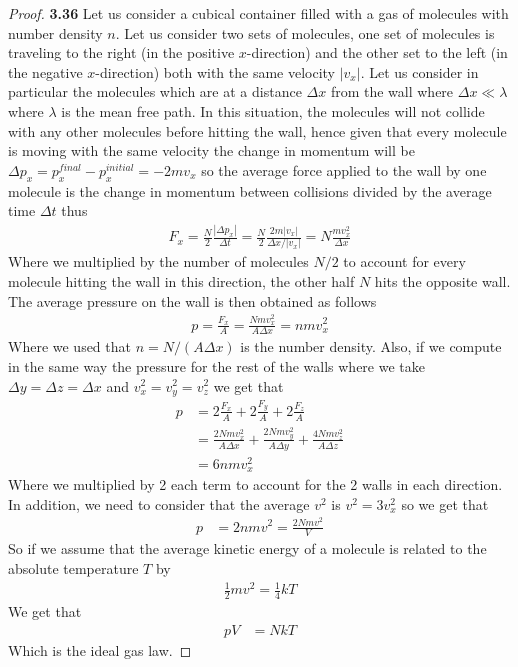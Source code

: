 \documentclass[11pt]{article}
\theoremstyle{definition}
\begin{document}
\begin{proof}{\textbf{3.36}}
    Let us consider a cubical container filled with  a gas of molecules with
    number density $n$.
    Let us consider two sets of molecules, one set of molecules
    is traveling to the right (in the positive $x$-direction)
    and the other set to the left (in the negative $x$-direction)
    both with the same velocity $|v_x|$.
    Let us consider in particular the molecules which are at a distance
    $\Delta x$ from the wall where $\Delta x \ll \lambda$ where $\lambda$
    is the mean free path. In this situation, the molecules will not collide
    with any other molecules before hitting the wall, hence given that
    every molecule is moving with the same velocity the change
    in momentum will be
    $\Delta p_{x} = p_x^{final} - p_x^{initial} = -2mv_{x}$ so the average
    force applied to the wall by one molecule is the change in momentum between
    collisions divided by the average time $\Delta t$ thus
    \begin{align*}
        F_{x} = \frac{N}{2}\frac{|\Delta p_{x}|}{\Delta t}
        = \frac{N}{2}\frac{2m|v_{x}|}{\Delta x/|v_{x}|}
        = N\frac{mv_{x}^2}{\Delta x}
    \end{align*}
    Where we multiplied by the number of molecules $N/2$ to account for every
    molecule hitting the wall in this direction, the other half $N$ hits
    the opposite wall.
    The average pressure on the wall is then obtained as follows
    \begin{align*}
        p = \frac{F_x}{A}
        = \frac{Nm v_x^2}{A\Delta x}
        = nm v_x^2
    \end{align*}
    Where we used that $n = N/(A\Delta x)$ is the number density.
    Also, if we compute in the same way the pressure for the rest of the walls
    where we take $\Delta y = \Delta z = \Delta x$ and $v_x^2 = v_y^2 = v_z^2$
    we get that
    \begin{align*}
        p &= 2\frac{F_x}{A} + 2\frac{F_y}{A} + 2\frac{F_z}{A}\\
        &= \frac{2Nm v_x^2}{A \Delta x} + \frac{2Nm v_y^2}{A \Delta y}
        + \frac{4Nm v_z^2}{A \Delta z}\\
        &= 6 nm v_x^2
    \end{align*}
    Where we multiplied by 2 each term to account for the 2 walls
    in each direction. In addition, we need to consider that the average $v^2$
    is $v^2 = 3v_x^2$ so we get that
    \begin{align*}
        p &= 2nm v^2 = \frac{2N m v^2}{V}
    \end{align*}
    So if we assume that the average kinetic energy of a molecule is related to
    the absolute temperature $T$ by
    \begin{align*}
        \frac{1}{2}mv^2 = \frac{1}{4}kT
    \end{align*}
    We get that
    \begin{align*}
        pV &= NkT
    \end{align*}
    Which is the ideal gas law.
\end{proof}
\end{document}
